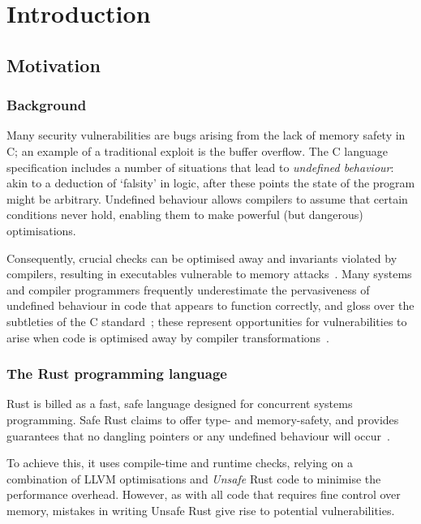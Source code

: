 \documentclass[dissertation.tex]{subfiles}
\begin{document}
\chapter{Introduction}
\label{ch:intro}

\section{Motivation}
\label{sec:intro-motiv}

\subsection{Background}
Many security vulnerabilities are bugs arising from the lack of memory
safety in C; an example of a traditional exploit is the buffer overflow.
The C language specification includes a number of situations that lead
to \emph{undefined behaviour}: akin to a deduction of `falsity' in
logic, after these points the state of the program might be arbitrary.
Undefined behaviour allows compilers to assume that certain conditions
never hold, enabling them to make powerful (but dangerous)
optimisations.

Consequently, crucial checks can be optimised away and invariants
violated by compilers, resulting in executables vulnerable to memory
attacks~\cite{simon2018wygiwyc}.
Many systems and compiler programmers frequently underestimate the
pervasiveness of undefined behaviour in code that appears to function
correctly, and gloss over the subtleties of the C
standard~\cite{memarian2016cdepths};
these represent opportunities for vulnerabilities to arise when code is
optimised away by compiler transformations~\cite{wang2013towards}.


\subsection{The Rust programming language}

Rust is billed as a fast, safe language designed for concurrent systems
programming.
Safe Rust claims to offer type- and memory-safety, and provides
guarantees that no dangling pointers or any undefined behaviour will
occur~\cite{rust-nomicon-safe-unsafe}.

To achieve this, it uses compile-time and runtime checks, relying on a
combination of LLVM optimisations and \emph{Unsafe} Rust code to
minimise the performance overhead.
However, as with all code that requires fine control over memory,
mistakes in writing Unsafe Rust give rise to potential vulnerabilities.
\end{document}
